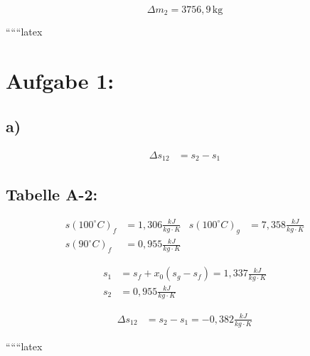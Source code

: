 \begin{equation*}
\Delta m_2 = 3756{,}9 \, \text{kg}
\end{equation*}

``````latex


\section*{Aufgabe 1:}

\subsection*{a)}

\begin{align*}
\Delta s_{12} &= s_2 - s_1
\end{align*}

\subsection*{Tabelle A-2:}

\begin{align*}
s(100^\circ C)_f &= 1{,}306 \frac{kJ}{kg \cdot K} & s(100^\circ C)_g &= 7{,}358 \frac{kJ}{kg \cdot K} \\
s(90^\circ C)_f &= 0{,}955 \frac{kJ}{kg \cdot K}
\end{align*}

\begin{align*}
s_1 &= s_f + x_0 (s_g - s_f) = 1{,}337 \frac{kJ}{kg \cdot K} \\
s_2 &= 0{,}955 \frac{kJ}{kg \cdot K}
\end{align*}

\begin{align*}
\Delta s_{12} &= s_2 - s_1 = -0{,}382 \frac{kJ}{kg \cdot K}
\end{align*}

``````latex


